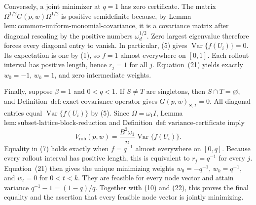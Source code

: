 Conversely, a joint minimizer at \(q=1\) has zero certificate.  The matrix \(\Omega^{1/2}G(p,w)\Omega^{1/2}\) is positive semidefinite because, by Lemma~\(\mathrm{lem{:}common\text{-}uniform\text{-}monomial\text{-}covariance}\), it is a covariance matrix after diagonal rescaling by the positive numbers \(\omega_d^{1/2}\).  Zero largest eigenvalue therefore forces every diagonal entry to vanish.  In particular, (5) gives \(\operatorname{Var}\{f(U_i)\}=0\).  Its expectation is one by (1), so \(f=1\) almost everywhere on \([0,1]\).  Each rollout interval has positive length, hence \(r_j=1\) for all \(j\).  Equation~(21) yields exactly \(w_0=-1\), \(w_k=1\), and zero intermediate weights.

Finally, suppose \(\beta=1\) and \(0<q<1\).  If \(S\ne T\) are singletons, then \(S\cap T=\varnothing\), and Definition~\(\mathrm{def{:}exact\text{-}covariance\text{-}operator}\) gives \(G(p,w)_{S,T}=0\).  All diagonal entries equal \(\operatorname{Var}\{f(U_i)\}\) by (5).  Since \(\Omega=\omega_1I\), Lemma~\(\mathrm{lem{:}subset\text{-}lattice\text{-}block\text{-}reduction}\) and Definition~\(\mathrm{def{:}variance\text{-}certificate}\) imply
\[
V_{\mathrm{rob}}(p,w)
=\frac{B^2\omega_1}{n}\operatorname{Var}\{f(U_i)\}.
\tag{22}
\]
Equality in (7) holds exactly when \(f=q^{-1}\) almost everywhere on \([0,q]\).  Because every rollout interval has positive length, this is equivalent to \(r_j=q^{-1}\) for every \(j\).  Equation~(21) then gives the unique minimizing weights \(w_0=-q^{-1}\), \(w_k=q^{-1}\), and \(w_t=0\) for \(0<t<k\).  They are feasible for every node vector and attain variance \(q^{-1}-1=(1-q)/q\).  Together with (10) and (22), this proves the final equality and the assertion that every feasible node vector is jointly minimizing.